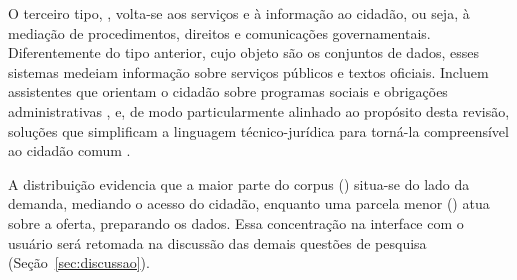 O terceiro tipo, , volta-se aos serviços e à informação ao cidadão, ou seja, à mediação de procedimentos, direitos e comunicações governamentais. Diferentemente do tipo anterior, cujo objeto são os conjuntos de dados, esses sistemas medeiam informação sobre serviços públicos e textos oficiais. Incluem assistentes que orientam o cidadão sobre programas sociais e obrigações administrativas \citep{Nagesh2025,HeyGoogleTaxes2025,Gao2023,IntelligentPractices2025}, e, de modo particularmente alinhado ao propósito desta revisão, soluções que simplificam a linguagem técnico-jurídica para torná-la compreensível ao cidadão comum \citep{Freitas_Silva_2026,wcge,Rakhimova2025}. \ifhl\mbox{\colorbox{yellow}{\citep{Syahidi2025,Kumar2024,Giarelis2026}}}\else\citep{Syahidi2025,Kumar2024,Giarelis2026}\fi{}\ifhl\mbox{\colorbox{yellow}{\citep{Ryu2025}}}\else\citep{Ryu2025}\fi{}\ifhl\mbox{\colorbox{yellow}{\citep{Tsourma2025}}}\else\citep{Tsourma2025}\fi{}

A distribuição evidencia que a maior parte do corpus () situa-se do lado da demanda, mediando o acesso do cidadão, enquanto uma parcela menor () atua sobre a oferta, preparando os dados. Essa concentração na interface com o usuário será retomada na discussão das demais questões de pesquisa (Seção~\ref{sec:discussao}).

\subsection{\texorpdfstring{}{Natureza e Domínio da Informação do Setor Público (RQ2)}}
\label{subsec:rq2}


